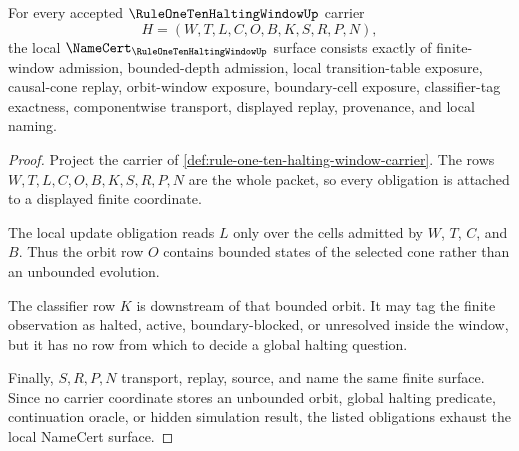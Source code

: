 \begin{theorem}
\label{thm:rule-one-ten-halting-window-namecert-obligations}
For every accepted $\RuleOneTenHaltingWindowUp$ carrier
$$
H=(W,T,L,C,O,B,K,S,R,P,N),
$$
the local $\NameCert_{\RuleOneTenHaltingWindowUp}$ surface consists exactly of finite-window admission, bounded-depth admission, local transition-table exposure, causal-cone replay, orbit-window exposure, boundary-cell exposure, classifier-tag exactness, componentwise transport, displayed replay, provenance, and local naming.
\end{theorem}
\begin{proof}
Project the carrier of \autoref{def:rule-one-ten-halting-window-carrier}. The rows $W,T,L,C,O,B,K,S,R,P,N$ are the whole packet, so every obligation is attached to a displayed finite coordinate.

The local update obligation reads $L$ only over the cells admitted by $W$, $T$, $C$, and $B$. Thus the orbit row $O$ contains bounded states of the selected cone rather than an unbounded evolution.

The classifier row $K$ is downstream of that bounded orbit. It may tag the finite observation as halted, active, boundary-blocked, or unresolved inside the window, but it has no row from which to decide a global halting question.

Finally, $S,R,P,N$ transport, replay, source, and name the same finite surface. Since no carrier coordinate stores an unbounded orbit, global halting predicate, continuation oracle, or hidden simulation result, the listed obligations exhaust the local NameCert surface.
\end{proof}

